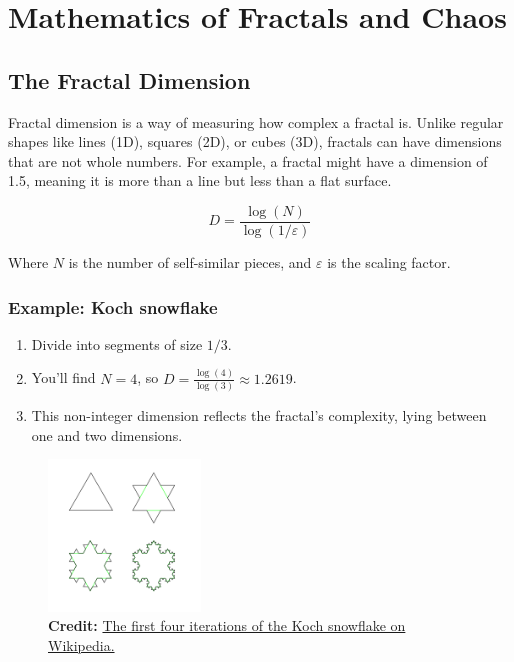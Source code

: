 \documentclass[12pt]{article}
\begin{document}
\newpage

\section{Mathematics of Fractals and Chaos}


\subsection{The Fractal Dimension}
Fractal dimension is a way of measuring how complex a fractal is. Unlike regular shapes like lines (1D), squares (2D), or cubes (3D), fractals can have dimensions that are not whole numbers. For example, a fractal might have a dimension of 1.5, meaning it is more than a line but less than a flat surface. 

\[
D = \frac{\log(N)}{\log(1/\varepsilon)}
\]

Where \( N \) is the number of self-similar pieces, and \( \varepsilon \) is the scaling factor.

\subsubsection{Example: Koch snowflake}
	\begin{enumerate}
		\item Divide into segments of size \(1/3\).
		\item You’ll find \(N = 4\), so \(D = \frac{\log(4)}{\log(3)} \approx 1.2619\).
		\item This non-integer dimension reflects the fractal's complexity, lying between one and two dimensions.
	\end{enumerate}
\begin{figure}[H] 
\centering 
\includegraphics[width=0.36\textwidth]{assets/KochFlake.png} 
\caption{\textbf{Credit:} \href{https://en.wikipedia.org/wiki/Koch_snowflake\#/media/File:KochFlake.svg}{The first four iterations of the Koch snowflake on Wikipedia.}}
\label{fig:example} 
\end{figure}
\end{document}
